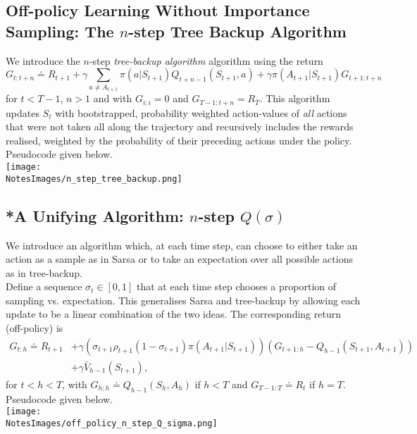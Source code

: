 \subsection{Off-policy Learning Without Importance Sampling: The $n$-step Tree Backup Algorithm}
We introduce the $n$-step \emph{tree-backup algorithm} algorithm using the return
\begin{equation}
    G_{t:t+n} \doteq R_{t+1} + \gamma \sum_{a \neq A_{t+1}} \pi(a|S_{t+1})Q_{t+n-1}(S_{t+1}, a) + \gamma \pi(A_{t+1}|S_{t+1})G_{t+1:t+n}
\end{equation}
for $t < T-1$, $n > 1$ and with $G_{i:i} = 0$ and $G_{T-1:t+n} = R_T$. This algorithm updates $S_t$ with bootstrapped, probability weighted action-values of \emph{all} actions that were not taken all along the trajectory and recursively includes the rewards realised, weighted by the probability of their preceding actions under the policy. Pseudocode given below.\\

\texttt{[image: \\NotesImages/n\_step\_tree\_backup.png]}\\
    
    
\subsection{*A Unifying Algorithm: $n$-step $Q(\sigma)$}
We introduce an algorithm which, at each time step, can choose to either take an action as a sample as in Sarsa or to take an expectation over all possible actions as in tree-backup. \\

Define a sequence $\sigma_t \in [0, 1]$ that at each time step chooses a proportion of sampling vs. expectation. This generalises Sarsa and tree-backup by allowing each update to be a linear combination of the two ideas. The corresponding return (off-policy) is 
\begin{align}
    G_{t:h} \doteq R_{t+1} &+ \gamma \left(\sigma_{t+1}\rho_{t+1}  (1- \sigma_{t+1})\pi(A_{t+1}\vert S_{t+1})\right) \left( G_{t+1:h} - Q_{h-1}(S_{t+1}, A_{t+1}) \right) \\ 
                           &+ \gamma \bar{V}_{h-1}(S_{t+1}),
\end{align}
for $t < h< T$, with $G_{h:h} \doteq Q_{h-1}(S_h, A_h)$ if $h<T$ and $G_{T-1:T} \doteq R_t$ if $h=T$. Pseudocode given below.\\

\texttt{[image: \\NotesImages/off\_policy\_n\_step\_Q\_sigma.png]}\\

    
    
    
    
    
    
    
    
    
    

